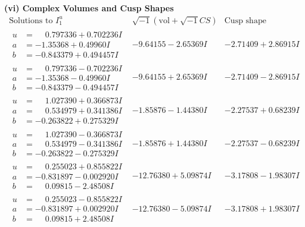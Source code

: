 \documentclass[1p]{elsarticle_modified}
\theoremstyle{definition}
\newcommand{\I}{\sqrt{-1}}
\begin{document}
\newpage\flushleft \textbf{(vi) Complex Volumes and Cusp Shapes}
$$\begin{array}{c|c|c}  
\text{Solutions to }I^u_{1}& \I (\text{vol} + \sqrt{-1}CS) & \text{Cusp shape}\\
 \hline 
\begin{aligned}
u &= \phantom{-}0.797336 + 0.702236 I \\
a &= -1.35368 + 0.49960 I \\
b &= -0.843379 + 0.494457 I\end{aligned}
 & -9.64155 - 2.65369 I & -2.71409 + 2.86915 I \\ \hline\begin{aligned}
u &= \phantom{-}0.797336 - 0.702236 I \\
a &= -1.35368 - 0.49960 I \\
b &= -0.843379 - 0.494457 I\end{aligned}
 & -9.64155 + 2.65369 I & -2.71409 - 2.86915 I \\ \hline\begin{aligned}
u &= \phantom{-}1.027390 + 0.366873 I \\
a &= \phantom{-}0.534979 + 0.341386 I \\
b &= -0.263822 + 0.275329 I\end{aligned}
 & -1.85876 - 1.44380 I & -2.27537 + 0.68239 I \\ \hline\begin{aligned}
u &= \phantom{-}1.027390 - 0.366873 I \\
a &= \phantom{-}0.534979 - 0.341386 I \\
b &= -0.263822 - 0.275329 I\end{aligned}
 & -1.85876 + 1.44380 I & -2.27537 - 0.68239 I \\ \hline\begin{aligned}
u &= \phantom{-}0.255023 + 0.855822 I \\
a &= -0.831897 - 0.002920 I \\
b &= \phantom{-}0.09815 - 2.48508 I\end{aligned}
 & -12.76380 + 5.09874 I & -3.17808 - 1.98307 I \\ \hline\begin{aligned}
u &= \phantom{-}0.255023 - 0.855822 I \\
a &= -0.831897 + 0.002920 I \\
b &= \phantom{-}0.09815 + 2.48508 I\end{aligned}
 & -12.76380 - 5.09874 I & -3.17808 + 1.98307 I \\ \hline\begin{aligned}

\end{aligned}
\end{array}$$
\end{document}
